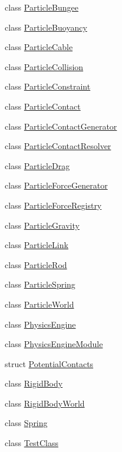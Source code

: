 \begin{DoxyCompactItemize}
\item 
class \hyperlink{classrum_1_1_particle_bungee}{Particle\+Bungee}
\item 
class \hyperlink{classrum_1_1_particle_buoyancy}{Particle\+Buoyancy}
\item 
class \hyperlink{classrum_1_1_particle_cable}{Particle\+Cable}
\item 
class \hyperlink{classrum_1_1_particle_collision}{Particle\+Collision}
\item 
class \hyperlink{classrum_1_1_particle_constraint}{Particle\+Constraint}
\item 
class \hyperlink{classrum_1_1_particle_contact}{Particle\+Contact}
\item 
class \hyperlink{classrum_1_1_particle_contact_generator}{Particle\+Contact\+Generator}
\item 
class \hyperlink{classrum_1_1_particle_contact_resolver}{Particle\+Contact\+Resolver}
\item 
class \hyperlink{classrum_1_1_particle_drag}{Particle\+Drag}
\item 
class \hyperlink{classrum_1_1_particle_force_generator}{Particle\+Force\+Generator}
\item 
class \hyperlink{classrum_1_1_particle_force_registry}{Particle\+Force\+Registry}
\item 
class \hyperlink{classrum_1_1_particle_gravity}{Particle\+Gravity}
\item 
class \hyperlink{classrum_1_1_particle_link}{Particle\+Link}
\item 
class \hyperlink{classrum_1_1_particle_rod}{Particle\+Rod}
\item 
class \hyperlink{classrum_1_1_particle_spring}{Particle\+Spring}
\item 
class \hyperlink{classrum_1_1_particle_world}{Particle\+World}
\item 
class \hyperlink{classrum_1_1_physics_engine}{Physics\+Engine}
\item 
class \hyperlink{classrum_1_1_physics_engine_module}{Physics\+Engine\+Module}
\item 
struct \hyperlink{structrum_1_1_potential_contacts}{Potential\+Contacts}
\item 
class \hyperlink{classrum_1_1_rigid_body}{Rigid\+Body}
\item 
class \hyperlink{classrum_1_1_rigid_body_world}{Rigid\+Body\+World}
\item 
class \hyperlink{classrum_1_1_spring}{Spring}
\item 
class \hyperlink{classrum_1_1_test_class}{Test\+Class}
\end{DoxyCompactItemize}
